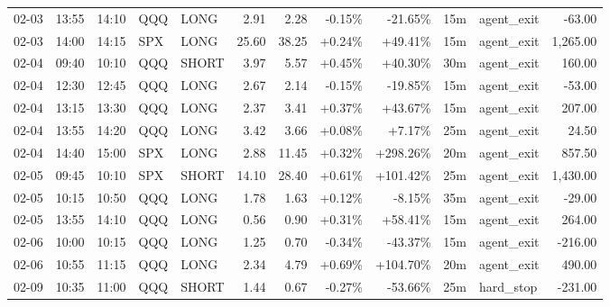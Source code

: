 \documentclass[11pt,a4paper]{article}
\begin{document}
\begin{center}
\begin{longtable}{>{\color{txtmain}}l l l l l r r r r r >{\color{txtmain}}l r}
02-03 & 13:55 & 14:10 & QQQ & LONG & 2.91 & 2.28 & \textcolor{lossred}{-0.15\%} & \textcolor{lossred}{-21.65\%} & 15m & agent\_exit & \textcolor{lossred}{-63.00} \\
02-03 & 14:00 & 14:15 & SPX & LONG & 25.60 & 38.25 & \textcolor{wingreen}{+0.24\%} & \textcolor{wingreen}{+49.41\%} & 15m & agent\_exit & \textcolor{wingreen}{1,265.00} \\
02-04 & 09:40 & 10:10 & QQQ & SHORT & 3.97 & 5.57 & \textcolor{wingreen}{+0.45\%} & \textcolor{wingreen}{+40.30\%} & 30m & agent\_exit & \textcolor{wingreen}{160.00} \\
02-04 & 12:30 & 12:45 & QQQ & LONG & 2.67 & 2.14 & \textcolor{lossred}{-0.15\%} & \textcolor{lossred}{-19.85\%} & 15m & agent\_exit & \textcolor{lossred}{-53.00} \\
02-04 & 13:15 & 13:30 & QQQ & LONG & 2.37 & 3.41 & \textcolor{wingreen}{+0.37\%} & \textcolor{wingreen}{+43.67\%} & 15m & agent\_exit & \textcolor{wingreen}{207.00} \\
02-04 & 13:55 & 14:20 & QQQ & LONG & 3.42 & 3.66 & \textcolor{wingreen}{+0.08\%} & \textcolor{wingreen}{+7.17\%} & 25m & agent\_exit & \textcolor{wingreen}{24.50} \\
02-04 & 14:40 & 15:00 & SPX & LONG & 2.88 & 11.45 & \textcolor{wingreen}{+0.32\%} & \textcolor{wingreen}{+298.26\%} & 20m & agent\_exit & \textcolor{wingreen}{857.50} \\
02-05 & 09:45 & 10:10 & SPX & SHORT & 14.10 & 28.40 & \textcolor{wingreen}{+0.61\%} & \textcolor{wingreen}{+101.42\%} & 25m & agent\_exit & \textcolor{wingreen}{1,430.00} \\
02-05 & 10:15 & 10:50 & QQQ & LONG & 1.78 & 1.63 & \textcolor{wingreen}{+0.12\%} & \textcolor{lossred}{-8.15\%} & 35m & agent\_exit & \textcolor{lossred}{-29.00} \\
02-05 & 13:55 & 14:10 & QQQ & LONG & 0.56 & 0.90 & \textcolor{wingreen}{+0.31\%} & \textcolor{wingreen}{+58.41\%} & 15m & agent\_exit & \textcolor{wingreen}{264.00} \\
02-06 & 10:00 & 10:15 & QQQ & LONG & 1.25 & 0.70 & \textcolor{lossred}{-0.34\%} & \textcolor{lossred}{-43.37\%} & 15m & agent\_exit & \textcolor{lossred}{-216.00} \\
02-06 & 10:55 & 11:15 & QQQ & LONG & 2.34 & 4.79 & \textcolor{wingreen}{+0.69\%} & \textcolor{wingreen}{+104.70\%} & 20m & agent\_exit & \textcolor{wingreen}{490.00} \\
02-09 & 10:35 & 11:00 & QQQ & SHORT & 1.44 & 0.67 & \textcolor{lossred}{-0.27\%} & \textcolor{lossred}{-53.66\%} & 25m & hard\_stop & \textcolor{lossred}{-231.00} \\

\end{longtable}
\end{center}
\end{document}
